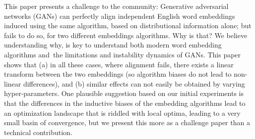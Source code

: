 This paper presents a challenge to the community: Generative adversarial networks (GANs) can perfectly align independent English word embeddings induced using the same algorithm, based on distributional information alone; but fails to do so, for two different embeddings algorithms. Why is that? We believe understanding why, is key to understand both modern word embedding algorithms and the limitations and instability dynamics of GANs. This paper shows that (a) in all these cases, where alignment fails, there exists a linear transform between the two embeddings (so algorithm biases do not lead to non-linear differences), and (b) similar effects can not easily be obtained by varying hyper-parameters. One plausible suggestion based on our initial experiments is that the differences in the inductive biases of the embedding  algorithms lead to an optimization landscape that is riddled with local optima, leading to a very small basin of convergence, but we present this more as a challenge paper than a technical contribution.
